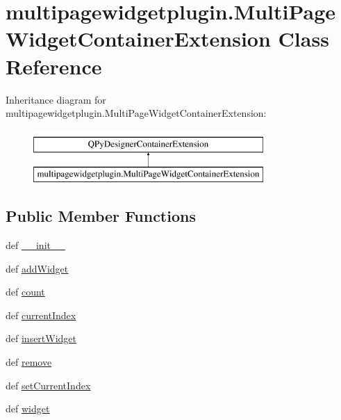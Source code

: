 \hypertarget{classmultipagewidgetplugin_1_1MultiPageWidgetContainerExtension}{}\section{multipagewidgetplugin.\+Multi\+Page\+Widget\+Container\+Extension Class Reference}
\label{classmultipagewidgetplugin_1_1MultiPageWidgetContainerExtension}
Inheritance diagram for multipagewidgetplugin.\+Multi\+Page\+Widget\+Container\+Extension\+:\begin{figure}[H]
\begin{center}
\leavevmode
\includegraphics[height=2.000000cm]{classmultipagewidgetplugin_1_1MultiPageWidgetContainerExtension}
\end{center}
\end{figure}
\subsection*{Public Member Functions}
\begin{DoxyCompactItemize}
\item 
def \hyperlink{classmultipagewidgetplugin_1_1MultiPageWidgetContainerExtension_a12bc3f33535d366ee8bed5347720d0f6}{\+\_\+\+\_\+init\+\_\+\+\_\+}
\item 
def \hyperlink{classmultipagewidgetplugin_1_1MultiPageWidgetContainerExtension_aea5c7f0a3ed694a0abe745caf8f59c4b}{add\+Widget}
\item 
def \hyperlink{classmultipagewidgetplugin_1_1MultiPageWidgetContainerExtension_a00ef36496d4e6b43d947c73428426476}{count}
\item 
def \hyperlink{classmultipagewidgetplugin_1_1MultiPageWidgetContainerExtension_ad1989dafceffbfb1062cca7a93eba72a}{current\+Index}
\item 
def \hyperlink{classmultipagewidgetplugin_1_1MultiPageWidgetContainerExtension_a3e2c8ba329617c6c54a045ea692953db}{insert\+Widget}
\item 
def \hyperlink{classmultipagewidgetplugin_1_1MultiPageWidgetContainerExtension_ab8b325b8f5f7c6eeaa18ade95d2f24b1}{remove}
\item 
def \hyperlink{classmultipagewidgetplugin_1_1MultiPageWidgetContainerExtension_a0d63b90fcd434179d20636266e214681}{set\+Current\+Index}
\item 
def \hyperlink{classmultipagewidgetplugin_1_1MultiPageWidgetContainerExtension_ad3b30885d6a8ef21849f3813bdd9a6f0}{widget}
\end{DoxyCompactItemize}


